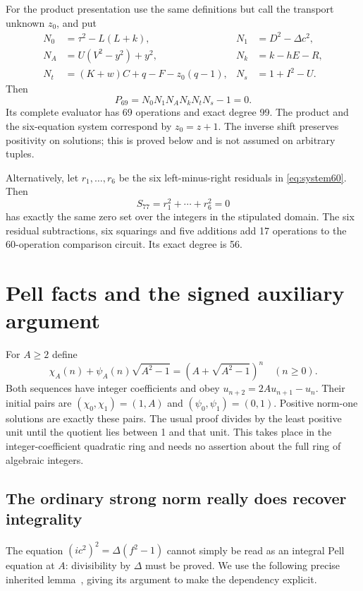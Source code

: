 \documentclass[11pt,a4paper]{article}
\theoremstyle{definition}\newtheorem{definition}[theorem]{Definition}
\theoremstyle{remark}\newtheorem{remark}[theorem]{Remark}
\begin{document}
For the product presentation use the same definitions but call the
transport unknown \(z_0\), and put
\begin{align*}
 N_0&=\tau^2-L(L+k),&N_1&=D^2-\Delta c^2,\\
 N_A&=U(V^2-y^2)+y^2,&N_k&=k-hE-R,\\
 N_t&=(K+w)C+q-F-z_0(q-1),&N_s&=1+I^2-U.
\end{align*}
Then
\begin{equation}\boxed{P_{69}=N_0N_1N_AN_kN_tN_s-1=0.}
\label{eq:p69}\end{equation}
Its complete evaluator has 69 operations and exact degree 99.
The product and the six-equation system correspond by
\(z_0=z+1\). The inverse shift preserves positivity on solutions;
this is proved below and is not assumed on arbitrary tuples.

Alternatively, let \(r_1,\ldots,r_6\) be the six left-minus-right
residuals in \eqref{eq:system60}. Then
\begin{equation}\boxed{S_{77}=r_1^2+\cdots+r_6^2=0}
\label{eq:sos77}\end{equation}
has exactly the same zero set over the integers in the stipulated domain.
The six residual subtractions, six squarings and five additions add 17
operations to the 60-operation comparison circuit. Its exact degree is 56.

\section{Pell facts and the signed auxiliary argument}
\label{sec:pell}

For \(A\ge2\) define
\[
 \chi_A(n)+\psi_A(n)\sqrt{A^2-1}
  =(A+\sqrt{A^2-1})^n\quad(n\ge0).
\]
Both sequences have integer coefficients and obey
\(u_{n+2}=2Au_{n+1}-u_n\). Their initial pairs are
\((\chi_0,\chi_1)=(1,A)\) and
\((\psi_0,\psi_1)=(0,1)\). Positive norm-one solutions are exactly
these pairs. The usual proof divides by the least positive unit until
the quotient lies between 1 and that unit. This takes place in the
integer-coefficient quadratic ring and needs no assertion about the
full ring of algebraic integers.

\subsection{The ordinary strong norm really does recover integrality}

The equation \((ic^2)^2=\Delta(f^2-1)\) cannot simply be read as an
integral Pell equation at \(A\): divisibility by \(\Delta\) must be
proved. We use the following precise inherited lemma~\cite{rank}, giving
its argument to make the dependency explicit.
\end{document}
